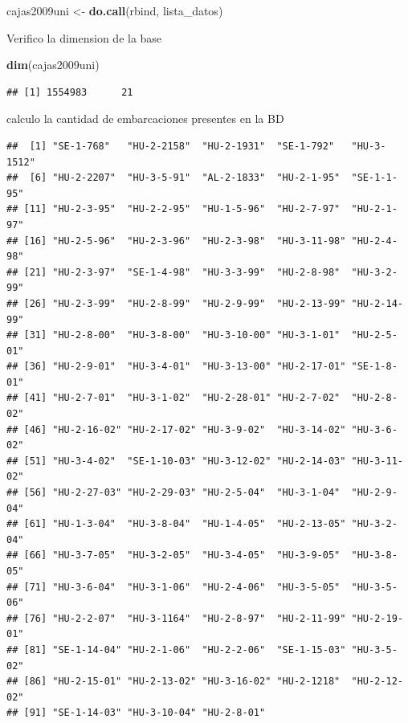 \documentclass[
]{article}
\newenvironment{Shaded}{\begin{snugshade}}{\end{snugshade}}
\newcommand{\FunctionTok}[1]{\textcolor[rgb]{0.13,0.29,0.53}{\textbf{#1}}}
\newcommand{\NormalTok}[1]{#1}
\newcommand{\OtherTok}[1]{\textcolor[rgb]{0.56,0.35,0.01}{#1}}
\newcommand{\SpecialCharTok}[1]{\textcolor[rgb]{0.81,0.36,0.00}{\textbf{#1}}}
\begin{document}
\begin{Shaded}
\begin{Highlighting}[]
\NormalTok{cajas2009uni }\OtherTok{\textless{}{-}} \FunctionTok{do.call}\NormalTok{(rbind, }
\NormalTok{                        lista\_datos)}
\end{Highlighting}
\end{Shaded}

Verifico la dimension de la base

\begin{Shaded}
\begin{Highlighting}[]
\FunctionTok{dim}\NormalTok{(cajas2009uni)}
\end{Highlighting}
\end{Shaded}

\begin{verbatim}
## [1] 1554983      21
\end{verbatim}

calculo la cantidad de embarcaciones presentes en la BD

\begin{Shaded}
\end{Shaded}

\begin{verbatim}
##  [1] "SE-1-768"   "HU-2-2158"  "HU-2-1931"  "SE-1-792"   "HU-3-1512" 
##  [6] "HU-2-2207"  "HU-3-5-91"  "AL-2-1833"  "HU-2-1-95"  "SE-1-1-95" 
## [11] "HU-2-3-95"  "HU-2-2-95"  "HU-1-5-96"  "HU-2-7-97"  "HU-2-1-97" 
## [16] "HU-2-5-96"  "HU-2-3-96"  "HU-2-3-98"  "HU-3-11-98" "HU-2-4-98" 
## [21] "HU-2-3-97"  "SE-1-4-98"  "HU-3-3-99"  "HU-2-8-98"  "HU-3-2-99" 
## [26] "HU-2-3-99"  "HU-2-8-99"  "HU-2-9-99"  "HU-2-13-99" "HU-2-14-99"
## [31] "HU-2-8-00"  "HU-3-8-00"  "HU-3-10-00" "HU-3-1-01"  "HU-2-5-01" 
## [36] "HU-2-9-01"  "HU-3-4-01"  "HU-3-13-00" "HU-2-17-01" "SE-1-8-01" 
## [41] "HU-2-7-01"  "HU-3-1-02"  "HU-2-28-01" "HU-2-7-02"  "HU-2-8-02" 
## [46] "HU-2-16-02" "HU-2-17-02" "HU-3-9-02"  "HU-3-14-02" "HU-3-6-02" 
## [51] "HU-3-4-02"  "SE-1-10-03" "HU-3-12-02" "HU-2-14-03" "HU-3-11-02"
## [56] "HU-2-27-03" "HU-2-29-03" "HU-2-5-04"  "HU-3-1-04"  "HU-2-9-04" 
## [61] "HU-1-3-04"  "HU-3-8-04"  "HU-1-4-05"  "HU-2-13-05" "HU-3-2-04" 
## [66] "HU-3-7-05"  "HU-3-2-05"  "HU-3-4-05"  "HU-3-9-05"  "HU-3-8-05" 
## [71] "HU-3-6-04"  "HU-3-1-06"  "HU-2-4-06"  "HU-3-5-05"  "HU-3-5-06" 
## [76] "HU-2-2-07"  "HU-3-1164"  "HU-2-8-97"  "HU-2-11-99" "HU-2-19-01"
## [81] "SE-1-14-04" "HU-2-1-06"  "HU-2-2-06"  "SE-1-15-03" "HU-3-5-02" 
## [86] "HU-2-15-01" "HU-2-13-02" "HU-3-16-02" "HU-2-1218"  "HU-2-12-02"
## [91] "SE-1-14-03" "HU-3-10-04" "HU-2-8-01"
\end{verbatim}
\end{document}
